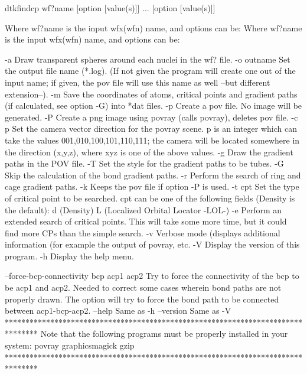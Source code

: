 	dtkfindcp wf?name [option [value(s)]] ... [option [value(s)]]

Where wf?name is the input wfx(wfn) name, and options can be:
Where wf?name is the input wfx(wfn) name, and options can be:

  -a        	Draw transparent spheres around each nuclei in the wf? file.
  -o outname	Set the output file name (*.log).
            	  (If not given the program will create one out of
            	  the input name; if given, the pov file will
            	  use this name as well --but different extension--).
  -m        	Save the coordinates of atoms, critical points and gradient
            	  paths (if calculated, see option -G) into *dat files.
  -p     	Create a pov file. No image will be generated.
  -P     	Create a png image using povray (calls povray),
         	  deletes pov file.
  -c p   	Set the camera vector direction for the povray scene.
         	  p is an integer which can take the values
         	  001,010,100,101,110,111; the camera will be located
         	  somewhere in the direction (x,y,z), where xyz is one of 
         	  the above values.
  -g     	Draw the gradient paths in the POV file.
  -T     	Set the style for the gradient paths to be tubes.
  -G     	Skip the calculation of the bond gradient paths.
  -r     	Perform the search of ring and cage gradient paths.
  -k     	Keeps the pov file if option -P is used.
  -t cpt 	Set the type of critical point to be searched. cpt can be 
         	  one of the following fields (Density is the default):
         		d (Density)
         		L (Localized Orbital Locator -LOL-)
  -e     	Perform an extended search of critical points. This
         	  will take some more time, but it could find more CPs
         	  than the simple search.
  -v     	Verbose mode (displays additional information (for example the 
         	  output of povray, etc.
  -V        	Display the version of this program.
  -h		Display the help menu.

  --force-bcp-connectivity bcp acp1 acp2 	Try to force the connectivity
            		  of the bcp to be acp1 and acp2. Needed to correct some
            		  cases wherein bond paths are not properly drawn.
            		  The option will try to force the bond path to be
            		  connected between acp1-bcp-acp2.
  --help    		Same as -h
  --version 		Same as -V
********************************************************************************
  Note that the following programs must be properly installed in your system:
                                     povray
                                 graphicsmagick
                                      gzip
********************************************************************************
